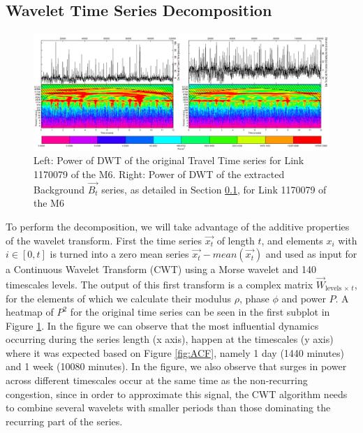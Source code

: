 \documentclass[a4paper, 10pt, conference]{ieeeconf}      %
\begin{document}
\subsection{Wavelet Time Series Decomposition}\label{decomposition}
\begin{figure}[htbp]
	\centerline{\includegraphics[width=\linewidth]{./images/WT_combined_1500_600.png}}
	\caption{Left: Power of DWT of the original Travel Time series for Link 1170079 of the M6.
	Right: Power of DWT of the extracted Background $\vec{B_t}$ series, as detailed in Section \ref{decomposition}, for Link 1170079 of the M6}
	\label{fig:wt}
\end{figure}
To perform the decomposition, we will take advantage of the additive properties of the wavelet transform. First the time series $\vec{x_t}$ of length $t$, and elements $x_i$ with $i \in [0,t]$ is turned into a zero mean series $\vec{x_t} - mean(\vec{x_t})$ and used as input for a Continuous Wavelet Transform (CWT) \cite{daubechies} \cite{mallat} using a Morse wavelet \cite{morse} and 140 timescales levels.
The output of this first transform is a complex matrix $\vec{W}_{\textrm{levels}\,\times\, t}$, for the elements of which we calculate their modulus $\rho$, phase $\phi$ and power $P$. 
A heatmap of $P^2$ for the original time series can be seen in the first subplot in Figure \ref{fig:wt}.
In the figure we can observe that the most influential dynamics occurring during the series length (x axis), happen at the timescales (y axis) where it was expected based on Figure \ref{fig:ACF}, namely 1 day (1440 minutes) and 1 week (10080 minutes).
In the figure, we also observe that surges in power across different timescales occur at the same time as the non-recurring congestion, since in order to approximate this signal, the CWT algorithm needs to combine several wavelets with smaller periods than those dominating the recurring part of the series.
\end{document}
